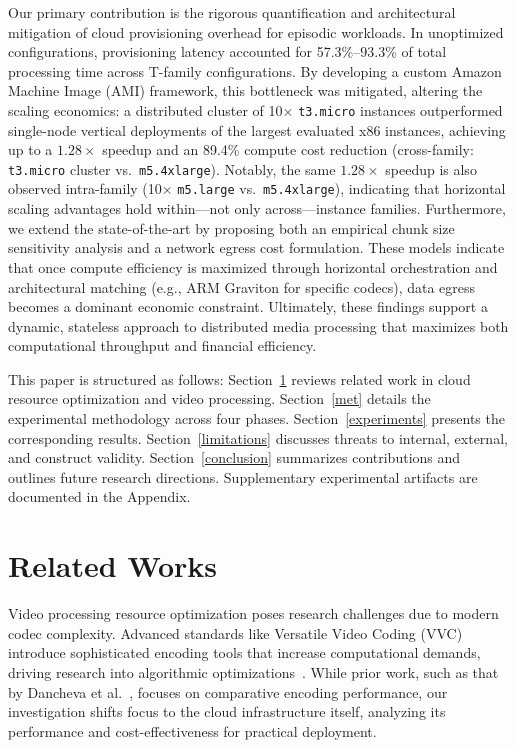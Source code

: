 \documentclass[conference]{IEEEtran}
\begin{document}
Our primary contribution is the rigorous quantification and architectural mitigation of cloud provisioning overhead for episodic workloads. In unoptimized configurations, provisioning latency accounted for 57.3\%--93.3\% of total processing time across T-family configurations. By developing a custom Amazon Machine Image (AMI) framework, this bottleneck was mitigated, altering the scaling economics: a distributed cluster of 10$\times$ \texttt{t3.micro} instances outperformed single-node vertical deployments of the largest evaluated x86 instances, achieving up to a $1.28\times$ speedup and an 89.4\% compute cost reduction (cross-family: \texttt{t3.micro} cluster vs.\ \texttt{m5.4xlarge}). Notably, the same $1.28\times$ speedup is also observed intra-family (10$\times$ \texttt{m5.large} vs.\ \texttt{m5.4xlarge}), indicating that horizontal scaling advantages hold within---not only across---instance families. Furthermore, we extend the state-of-the-art by proposing both an empirical chunk size sensitivity analysis and a network egress cost formulation. These models indicate that once compute efficiency is maximized through horizontal orchestration and architectural matching (e.g., ARM Graviton for specific codecs), data egress becomes a dominant economic constraint. Ultimately, these findings support a dynamic, stateless approach to distributed media processing that maximizes both computational throughput and financial efficiency.

This paper is structured as follows: Section~\ref{rel_works} reviews related
work in cloud resource optimization and video processing. Section~\ref{met}
details the experimental methodology across four phases.
Section~\ref{experiments} presents the corresponding results.
Section~\ref{limitations} discusses threats to internal, external, and
construct validity. Section~\ref{conclusion} summarizes contributions and
outlines future research directions. Supplementary experimental artifacts are
documented in the Appendix.

\section{Related Works}
\label{rel_works}

Video processing resource optimization poses research challenges due to modern
codec complexity. Advanced standards like Versatile Video Coding (VVC)
introduce sophisticated encoding tools that increase computational demands,
driving research into algorithmic optimizations~\cite{b15, b16}. While prior
work, such as that by Dancheva et al.~\cite{b3}, focuses on
comparative encoding performance, our investigation shifts focus to the cloud
infrastructure itself, analyzing its performance and cost-effectiveness for
practical deployment.
\end{document}
